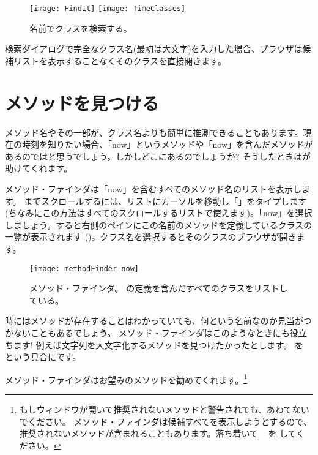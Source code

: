 \documentclass[a4paper,10pt,twoside]{book}
\begin{document}
\begin{figure}[hbt]
\centerline{
	\texttt{[image: FindIt]}
	\hspace{1cm}
	\texttt{[image: TimeClasses]}
}
\caption{名前でクラスを検索する。
}
\end{figure}

検索ダイアログで完全なクラス名(最初は大文字)を入力した場合、ブラウザは候補リストを表示することなくそのクラスを直接開きます。

\section{メソッドを見つける}

メソッド名やその一部が、クラス名よりも簡単に推測できることもあります。現在の時刻を知りたい場合、「now」というメソッドや「now」を含んだメソッドがあるのではと思うでしょう。しかしどこにあるのでしょうか?
そうしたときはが助けてくれます。

メソッド・ファインダは「now」を含むすべてのメソッド名のリストを表示します。
 までスクロールするには、リストにカーソルを移動し「」をタイプします(ちなみにこの方法はすべてのスクロールするリストで使えます)。「now」を選択しましょう。すると右側のペインにこの名前のメソッドを定義しているクラスの一覧が表示されます ()。クラス名を選択するとそのクラスのブラウザが開きます。

\begin{figure}[hbt]
\centerline {\texttt{[image: methodFinder-now]}}
\caption{メソッド・ファインダ。 の定義を含んだすべてのクラスをリストしている。
}
\end{figure}

時にはメソッドが存在することはわかっていても、何という名前なのか見当がつかないこともあるでしょう。
メソッド・ファインダはこのようなときにも役立ちます! 例えば文字列を大文字化するメソッドを見つけたかったとします。 を  という具合にです。


\noindent
メソッド・ファインダはお望みのメソッドを勧めてくれます。\footnote{もしウィンドウが開いて推奨されないメソッドと警告されても、あわてないでください。 メソッド・ファインダは候補すべてを表示しようとするので、推奨されないメソッドが含まれることもあります。落ち着いて ~ を \click してください。}
\end{document}

